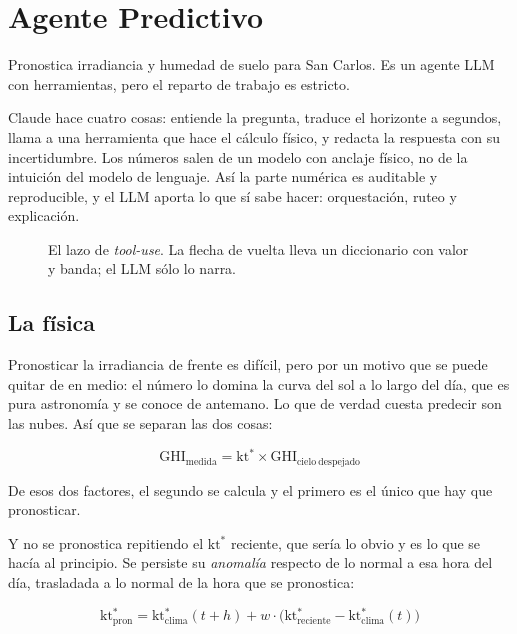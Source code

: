 \section{Agente Predictivo}

Pronostica irradiancia y humedad de suelo para San Carlos. Es un agente LLM con
herramientas, pero el reparto de trabajo es estricto.

\begin{clave}[title=El LLM nunca toca los números]
Claude hace cuatro cosas: entiende la pregunta, traduce el horizonte a segundos, llama a
una herramienta que hace el cálculo físico, y redacta la respuesta con su incertidumbre.
Los números salen de un modelo con anclaje físico, no de la intuición del modelo de
lenguaje. Así la parte numérica es auditable y reproducible, y el LLM aporta lo que sí
sabe hacer: orquestación, ruteo y explicación.
\end{clave}

\begin{figure}[htbp]
\centering
\resizebox{\textwidth}{!}{}
\caption{El lazo de \emph{tool-use}. La flecha de vuelta lleva un diccionario con valor y
banda; el LLM sólo lo narra.}
\end{figure}

\subsection{La física}

Pronosticar la irradiancia de frente es difícil, pero por un motivo que se puede quitar de
en medio: el número lo domina la curva del sol a lo largo del día, que es pura astronomía y
se conoce de antemano. Lo que de verdad cuesta predecir son las nubes. Así que se separan
las dos cosas:

\begin{equation*}
  \mathrm{GHI_{medida}} = \mathrm{kt^*} \times \mathrm{GHI_{cielo\ despejado}}
\end{equation*}

De esos dos factores, el segundo se calcula y el primero es el único que hay que
pronosticar.

Y no se pronostica repitiendo el $\mathrm{kt^*}$ reciente, que sería lo obvio y es lo que
se hacía al principio. Se persiste su \emph{anomalía} respecto de lo normal a esa hora del
día, trasladada a lo normal de la hora que se pronostica:

\begin{equation*}
  \mathrm{kt^*_{pron}} = \mathrm{kt^*_{clima}}(t+h)
  + w \cdot \Big( \mathrm{kt^*_{reciente}} - \mathrm{kt^*_{clima}}(t) \Big)
\end{equation*}

